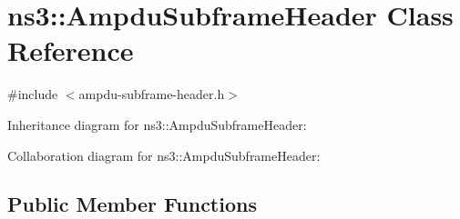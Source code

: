 \hypertarget{classns3_1_1AmpduSubframeHeader}{}\section{ns3\+:\+:Ampdu\+Subframe\+Header Class Reference}
\label{classns3_1_1AmpduSubframeHeader}


{\ttfamily \#include $<$ampdu-\/subframe-\/header.\+h$>$}



Inheritance diagram for ns3\+:\+:Ampdu\+Subframe\+Header\+:


Collaboration diagram for ns3\+:\+:Ampdu\+Subframe\+Header\+:
\subsection*{Public Member Functions}
